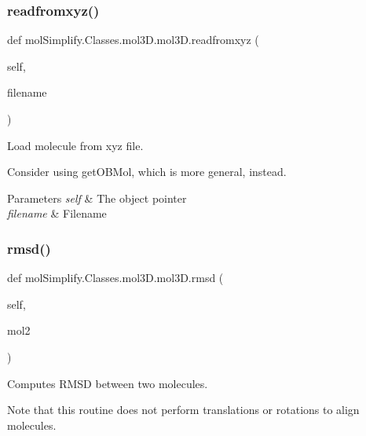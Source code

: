 \subsubsection{\texorpdfstring{readfromxyz()}{readfromxyz()}}
{\footnotesize\ttfamily def mol\+Simplify.\+Classes.\+mol3\+D.\+mol3\+D.\+readfromxyz (\begin{DoxyParamCaption}\item[{}]{self,  }\item[{}]{filename }\end{DoxyParamCaption})}



Load molecule from xyz file. 

Consider using get\+O\+B\+Mol, which is more general, instead. 
\begin{DoxyParams}{Parameters}
{\em self} & The object pointer \\
\hline
{\em filename} & Filename \\
\hline
\end{DoxyParams}
\mbox{\label{classmolSimplify_1_1Classes_1_1mol3D_1_1mol3D_a970c3cdf7b4a051715a89e284d4227e6}} 
\subsubsection{\texorpdfstring{rmsd()}{rmsd()}}
{\footnotesize\ttfamily def mol\+Simplify.\+Classes.\+mol3\+D.\+mol3\+D.\+rmsd (\begin{DoxyParamCaption}\item[{}]{self,  }\item[{}]{mol2 }\end{DoxyParamCaption})}



Computes R\+M\+SD between two molecules. 

Note that this routine does not perform translations or rotations to align molecules.

